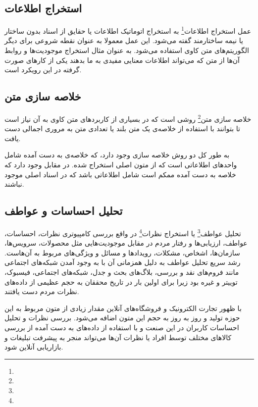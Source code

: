\documentclass[12pt, a4paper, oneside]{report}
\begin{document}
\subsection{استخراج اطلاعات}

عمل 
استخراج اطلاعات\footnote{}
به استخراج اتوماتیک اطلاعات یا حقایق از اسناد بدون ساختار یا نیمه ساختارمند گفته می‌شود.
این عمل معمولا به عنوان نقطه شروعی برای دیگر الگوریتم‌های متن کاوی استفاده می‌شود. به عنوان مثال استخراج
موجودیت‌ها و روابط آن‌ها از متن که می‌تواند اطلاعات معنایی مفیدی به ما بدهند یکی از کار‌های صورت گرفته
در این رویکرد است\cite{DBLP:journals/corr/AllahyariPASTGK17a}.

\subsection{خلاصه سازی متن}

خلاصه سازی متن\footnote{}
روشی است که در بسیاری از کاربرد‌های متن کاوی به آن نیاز است تا بتوانند با استفاده از خلاصه‌ی یک متن بلند
یا تعدادی متن به مروری اجمالی دست یافت.

به طور کل دو روش خلاصه سازی وجود دارد،
که خلاصه‌ی به دست آمده شامل واحد‌های اطلاعاتی است که از متون اصلی استخراج شده. در مقابل
وجود دارد که خلاصه به دست آمده ممکم است شامل اطلاعاتی باشد که در اسناد اصلی موجود نباشند\cite{DBLP:journals/corr/AllahyariPASTGK17a}.

\subsection{تحلیل احساسات و عواطف}

تحلیل عواطف\footnote{}
یا
استخراج نظرات\footnote{}
در واقع بررسی کامپیوتری نظرات، احساسات، عواطف، ارزیابی‌ها و رفتار مردم در مقابل موجودیت‌هایی
مثل محصولات، سرویس‌ها، سازمان‌ها، اشخاص، مشکلات، رویدادها و مسائل و ویژگی‌های مربوط به آن‌هاست.
رشد سریع
تحلیل عواطف
به دلیل همزمانی آن با به وجود آمدن شبکه‌های اجتماعی مانند فروم‌های نقد و بررسی، بلاگ‌های بحث و جدل،
شبکه‌های اجتماعی، فیسبوک، توییتر و غیره بود زیرا برای اولین بار در تاریخ محققان به حجم عظیمی
از داده‌های نظرات مردم دست یافتند.
\cite{zhang2018deep}

با ظهور تجارت الکترونیک و فروشگاه‌های آنلاین مقدار زیادی از متون مربوط به این حوزه تولید و روز به روز
به حجم این متون اضافه می‌شود. بررسی نظرات و تحلیل احساسات کاربران در این صنعت و با استفاده از داده‌های به دست
آمده از بررسی کالاهای مختلف توسط افراد یا نظرات آن‌ها می‌تواند منجر به پیشرفت تبلیغات و بازاریابی آنلاین شود\cite{DBLP:journals/corr/AllahyariPASTGK17a}.
\end{document}
